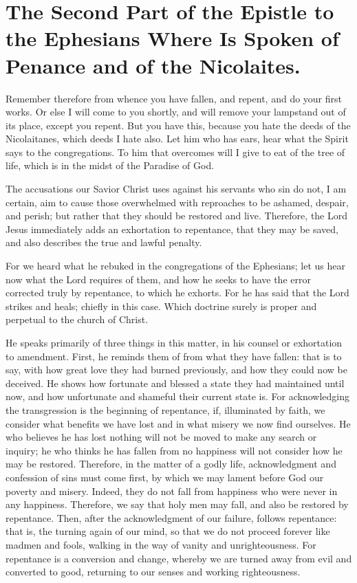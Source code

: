 \chapter[Sermon 8. The Second Part of the Epistle to the Ephesians Where Is Spoken of Penance and of the Nicolaites.]{The Second Part of the Epistle to the Ephesians Where Is Spoken of Penance and of the Nicolaites.}
\label{sermon:008}

Remember therefore from whence you have fallen, and repent, and do your first works. Or else I will come to you shortly, and will remove your lampstand out of its place, except you repent. But you have this, because you hate the deeds of the Nicolaitanes, which deeds I hate also. Let him who has ears, hear what the Spirit says to the congregations. To him that overcomes will I give to eat of the tree of life, which is in the midst of the Paradise of God.

The accusations our Savior Christ uses against his servants who sin do not, I am certain, aim to cause those overwhelmed with reproaches to be ashamed, despair, and perish; but rather that they should be restored and live. Therefore, the Lord Jesus immediately adds an exhortation to repentance, that they may be saved, and also describes the true and lawful penalty.

For we heard what he rebuked in the congregations of the Ephesians; let us hear now what the Lord requires of them, and how he seeks to have the error corrected truly by repentance, to which he exhorts. For he has said that the Lord strikes and heals; chiefly in this case. Which doctrine surely is proper and perpetual to the church of Christ.

He speaks primarily of three things in this matter, in his counsel or exhortation to amendment. First, he reminds them of from what they have fallen: that is to say, with how great love they had burned previously, and how they could now be deceived. He shows how fortunate and blessed a state they had maintained until now, and how unfortunate and shameful their current state is. For acknowledging the transgression is the beginning of repentance, if, illuminated by faith, we consider what benefits we have lost and in what misery we now find ourselves. He who believes he has lost nothing will not be moved to make any search or inquiry; he who thinks he has fallen from no happiness will not consider how he may be restored. Therefore, in the matter of a godly life, acknowledgment and confession of sins must come first, by which we may lament before God our poverty and misery. Indeed, they do not fall from happiness who were never in any happiness. Therefore, we say that holy men may fall, and also be restored by repentance. Then, after the acknowledgment of our failure, follows repentance: that is, the turning again of our mind, so that we do not proceed forever like madmen and fools, walking in the way of vanity and unrighteousness. For repentance is a conversion and change, whereby we are turned away from evil and converted to good, returning to our senses and working righteousness.

